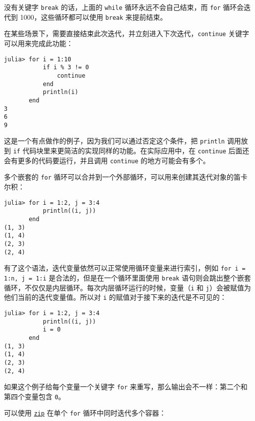 没有关键字 \texttt{break} 的话，上面的 \texttt{while} 循环永远不会自己结束，而 \texttt{for} 循环会迭代到 1000，这些循环都可以使用 \texttt{break} 来提前结束。



在某些场景下，需要直接结束此次迭代，并立刻进入下次迭代，\texttt{continue} 关键字可以用来完成此功能：




\begin{verbatim}
julia> for i = 1:10
           if i % 3 != 0
               continue
           end
           println(i)
       end
3
6
9
\end{verbatim}



这是一个有点做作的例子，因为我们可以通过否定这个条件，把 \texttt{println} 调用放到 \texttt{if} 代码块里来更简洁的实现同样的功能。在实际应用中，在 \texttt{continue} 后面还会有更多的代码要运行，并且调用 \texttt{continue} 的地方可能会有多个。



多个嵌套的 \texttt{for} 循环可以合并到一个外部循环，可以用来创建其迭代对象的笛卡尔积：




\begin{verbatim}
julia> for i = 1:2, j = 3:4
           println((i, j))
       end
(1, 3)
(1, 4)
(2, 3)
(2, 4)
\end{verbatim}



有了这个语法，迭代变量依然可以正常使用循环变量来进行索引，例如 \texttt{for i = 1:n, j = 1:i} 是合法的，但是在一个循环里面使用 \texttt{break} 语句则会跳出整个嵌套循环，不仅仅是内层循环。每次内层循环运行的时候，变量（\texttt{i} 和 \texttt{j}）会被赋值为他们当前的迭代变量值。所以对 \texttt{i} 的赋值对于接下来的迭代是不可见的：




\begin{verbatim}
julia> for i = 1:2, j = 3:4
           println((i, j))
           i = 0
       end
(1, 3)
(1, 4)
(2, 3)
(2, 4)
\end{verbatim}



如果这个例子给每个变量一个关键字 \texttt{for} 来重写，那么输出会不一样：第二个和第四个变量包含 \texttt{0}。



可以使用 \hyperlink{11836366300100000234}{\texttt{zip}} 在单个 \texttt{for} 循环中同时迭代多个容器：




